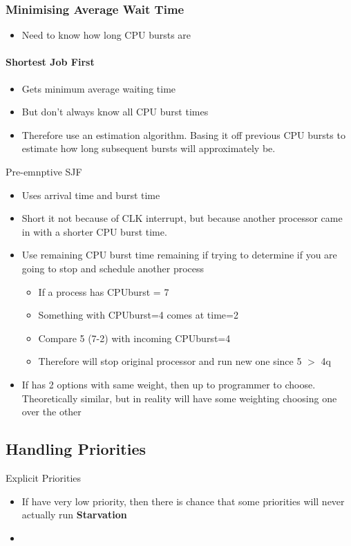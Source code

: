 \documentclass{article}
\begin{document}
		\subsubsection{Minimising Average Wait Time}
			\begin{itemize}
				\item Need to know how long CPU bursts are
			\end{itemize}

			\paragraph{Shortest Job First}
			\begin{itemize}
				\item Gets minimum average waiting time
				\item But don't always know all CPU burst times
				\item Therefore use an estimation algorithm. Basing it off previous CPU bursts to estimate how long subsequent bursts will approximately be.
			\end{itemize}

			Pre-emnptive SJF
			\begin{itemize}
				\item Uses arrival time and burst time
				\item Short it not because of CLK interrupt, but because another processor came in with a shorter CPU burst time.
				\item Use remaining CPU burst time remaining if trying to determine if you are going to stop and schedule another process
				\begin{itemize}
					\item If a process has CPUburst = 7 
					\item Something with CPUburst=4 comes at time=2
					\item Compare 5 (7-2) with incoming CPUburst=4
					\item Therefore will stop original processor and run new one since 5 $>$ 4q
				\end{itemize}
				\item If has 2 options with same weight, then up to programmer to choose. Theoretically similar, but in reality will have some weighting choosing one over the other
			\end{itemize}

	\subsection{Handling Priorities}
		Explicit Priorities
		\begin{itemize}
			\item If have very low priority, then there is chance that some priorities will never actually run \textbf{Starvation}
			\item
		\end{itemize}
\end{document}
